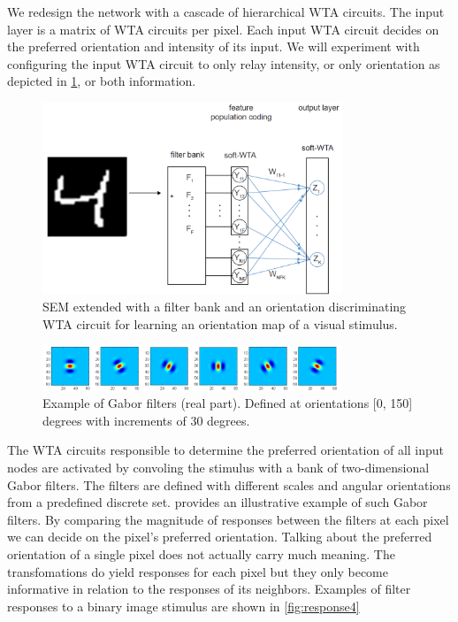 \documentclass{report}
\begin{document}
We redesign the network with a cascade of hierarchical WTA circuits. The input layer is a matrix of WTA circuits per pixel. Each input WTA circuit decides on the preferred orientation and intensity of its input. We will experiment with configuring the input WTA circuit to only relay intensity, or only orientation as depicted in \cref{fig:network_learn_orientations}, or both information.

\begin{figure}[ht]
\centering
\includegraphics[width=0.8\textwidth]{network_learn_orientations}
\caption{SEM extended with a filter bank and an orientation discriminating WTA circuit for learning an orientation map of a visual stimulus. \label{fig:network_learn_orientations}}
\end{figure}

\begin{figure}[ht]
\centering
\includegraphics[width=0.8\textwidth]{filters_real}
\caption{Example of Gabor filters (real part). Defined at orientations [0, 150] degrees with increments of 30 degrees. \label{fig:filters_real}}
\end{figure}

The WTA circuits responsible to determine the preferred orientation of all input nodes are activated by convoling the stimulus with a bank of two-dimensional Gabor filters. The filters are defined with different scales and angular orientations from a predefined discrete set.  provides an illustrative example of such Gabor filters. By comparing the magnitude of responses between the filters at each pixel we can decide on the pixel's preferred orientation. Talking about the preferred orientation of a single pixel does not actually carry much meaning. The transfomations do yield responses for each pixel but they only become informative in relation to the responses of its neighbors. Examples of filter responses to a binary image stimulus are shown in \cref{fig:response4}
\end{document}
